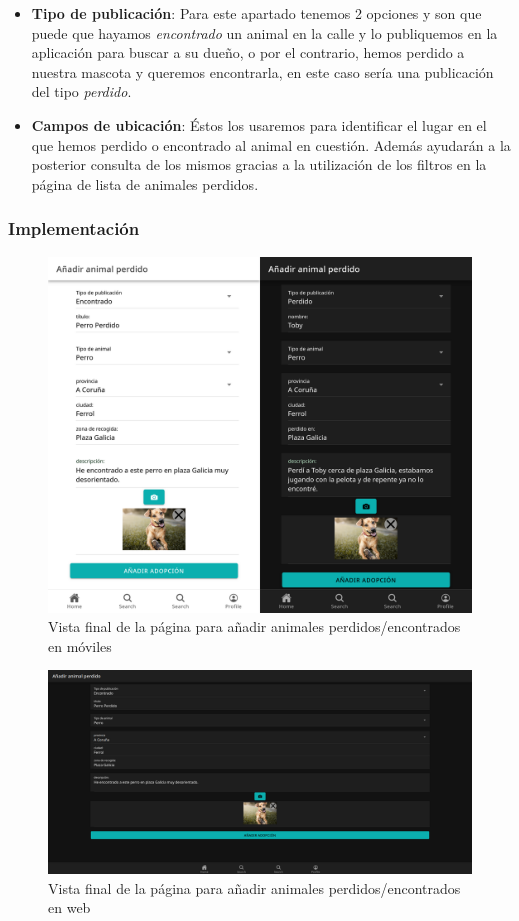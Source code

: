 \begin{itemize}
	\item \textbf{Tipo de publicación}: Para este apartado tenemos 2 opciones y son que puede que hayamos \textit{encontrado} un animal en la calle y lo publiquemos en la aplicación para buscar a su dueño, o por el contrario, hemos perdido a nuestra mascota y queremos encontrarla, en este caso sería una publicación del tipo \textit{perdido}. \\ 
	
	\item \textbf{Campos de ubicación}: Éstos los usaremos para identificar el lugar en el que hemos perdido o encontrado al animal en cuestión. Además ayudarán a la posterior consulta de los mismos gracias a la utilización de los filtros en la página de lista de animales perdidos. \\
	
\end{itemize}

\subsubsection{Implementación}

\begin{figure}[H]
	\centering
	\includegraphics[width=0.8\linewidth]{"sprint 2/hu4/impPerdidos"}
	\caption{Vista final de la página para añadir animales perdidos/encontrados en móviles}
	\label{fig:impperdidos}
\end{figure}

\begin{figure}[H]
	\centering
	\includegraphics[width=0.8\linewidth]{"sprint 2/hu4/impPerdidosWeb"}
	\caption{Vista final de la página para añadir animales perdidos/encontrados en web}
	\label{fig:impperdidosweb}
\end{figure}

